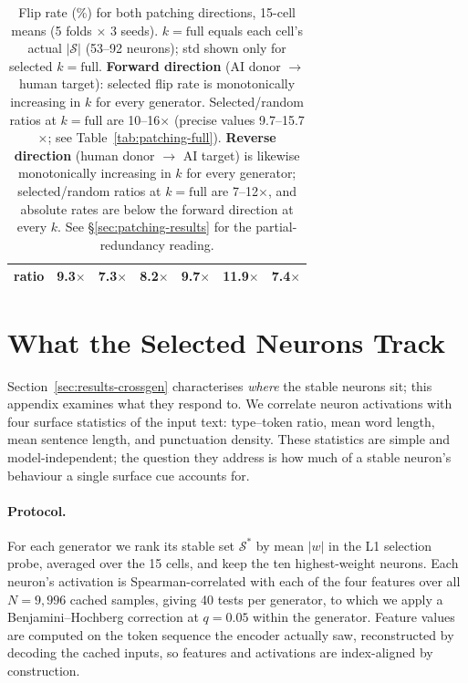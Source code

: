 \documentclass[11pt]{article}
\begin{document}
\begin{table}[!htbp]
\begin{tabular}{lrrrrrr}
ratio           & 9.3$\times$ & 7.3$\times$ & 8.2$\times$ & 9.7$\times$ & 11.9$\times$ & 7.4$\times$ \\
\bottomrule
\end{tabular}
\caption{Flip rate (\%) for both patching directions, 15-cell means (5 folds $\times$ 3 seeds). $k = \text{full}$ equals each cell's actual $|\mathcal{S}|$ (53--92 neurons); std shown only for selected $k = \text{full}$. \textbf{Forward direction} (AI donor $\to$ human target): selected flip rate is monotonically increasing in $k$ for every generator. Selected/random ratios at $k = \text{full}$ are 10--16$\times$ (precise values 9.7--15.7$\times$; see Table~\ref{tab:patching-full}). \textbf{Reverse direction} (human donor $\to$ AI target) is likewise monotonically increasing in $k$ for every generator; selected/random ratios at $k = \text{full}$ are 7--12$\times$, and absolute rates are below the forward direction at every $k$. See §\ref{sec:patching-results} for the partial-redundancy reading.}
\label{tab:patching-sweep}
\end{table}

\section{What the Selected Neurons Track}
\label{app:features}

Section~\ref{sec:results-crossgen} characterises \textit{where} the stable
neurons sit; this appendix examines what they respond to. We correlate neuron
activations with four surface statistics of the input text: type--token ratio,
mean word length, mean sentence length, and punctuation density. These
statistics are simple and model-independent; the question they address is how
much of a stable neuron's behaviour a single surface cue accounts for.

\paragraph{Protocol.}
For each generator we rank its stable set $\mathcal{S}^{*}$ by mean $|w|$ in
the L1 selection probe, averaged over the 15 cells, and keep the ten
highest-weight neurons. Each neuron's activation is Spearman-correlated with
each of the four features over all $N=9{,}996$ cached samples, giving 40 tests
per generator, to which we apply a Benjamini--Hochberg correction at $q=0.05$
within the generator. Feature values are computed on the token sequence the
encoder actually saw, reconstructed by decoding the cached inputs, so features
and activations are index-aligned by construction.
\end{document}
